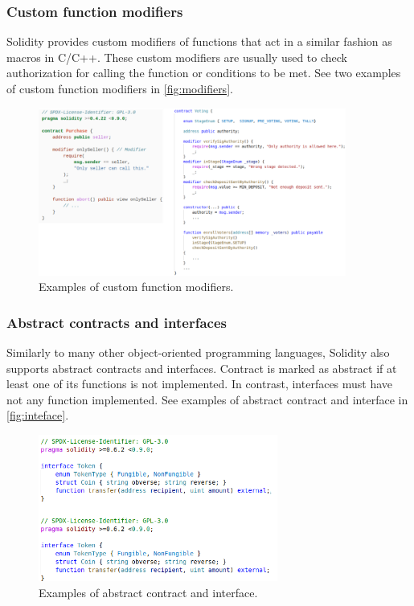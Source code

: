 \subsubsection{Custom function modifiers}\label{sec:modifiers}
Solidity provides custom modifiers of functions that act in a similar fashion as macros in C/C++.
These custom modifiers are usually used to check authorization for calling the function or conditions to be met.
See two examples of custom function modifiers in \autoref{fig:modifiers}.

\begin{figure}[t]
	\begin{center}
		\includegraphics[width=0.9\textwidth]{./figs/modifiers-custom.png}
		\caption{Examples of custom function modifiers.}		
		\label{fig:modifiers}
	\end{center}	
\end{figure}

\subsubsection{Abstract contracts and interfaces}\label{sec:interfaces}
Similarly to  many other object-oriented programming languages, Solidity also supports abstract contracts and interfaces.
Contract is marked as abstract if at least one of its functions is not implemented. In contrast, interfaces must have not any function implemented.
See examples of abstract contract and interface in \autoref{fig:inteface}. 

\begin{figure}[bt]
	\begin{center}
		\includegraphics[width=0.7\textwidth]{./figs/abstract-contract.png}
		\caption{Examples of abstract contract and interface.}		
		\label{fig:inteface}
	\end{center}	
\end{figure}




